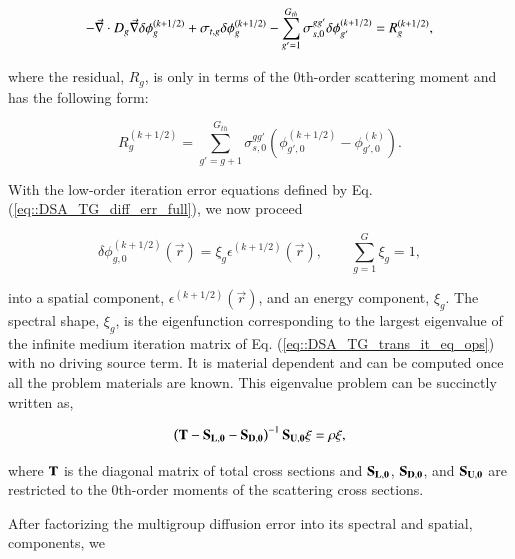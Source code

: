 \documentclass[preprint,10pt]{elsarticle}
\begin{document}
\begin{equation}
\label{eq::DSA_TG_diff_err_full}
-\vec{\nabla} \cdot D_g \vec{\nabla} \delta \phi_{g}^{(k+1/2)} + \sigma_{t,g} \delta \phi_{g}^{(k+1/2)} - \sum\displaylimits_{g'=1}^{G_{th}} \sigma_{s,0}^{g g'} \delta \phi_{g'}^{(k+1/2)} = R_g^{(k+1/2)} ,
\end{equation}

\noindent where the residual, $R_g$, is only in terms of the 0th-order scattering moment and has the following form:

\begin{equation}
\label{eq::DSA_TG_diff_residual}
R_g^{(k+1/2)} = \sum_{g'=g+1}^{G_{th}} \sigma_{s,0}^{g g'} \left( \phi_{g',0}^{(k+1/2)} - \phi_{g',0}^{(k)} \right) .
\end{equation}


With the low-order iteration error equations defined by Eq. (\ref{eq::DSA_TG_diff_err_full}), we now proceed

\begin{equation}
\label{eq::DSA_TG_fact_err}
\delta \phi_{g,0}^{(k+1/2)} (\vec{r}) = \xi_g \epsilon^{(k+1/2)} (\vec{r}), \qquad \sum_{g=1}^G \xi_g = 1,
\end{equation}

\noindent into a spatial component, $\epsilon^{(k+1/2)} (\vec{r})$, and an energy component, $\xi_g$. The spectral shape, $\xi_g$, is the eigenfunction corresponding to the largest eigenvalue of the infinite medium iteration matrix of Eq. (\ref{eq::DSA_TG_trans_it_eq_ops}) with no driving source term. It is material dependent and can be computed once all the problem materials are known. This eigenvalue problem can be succinctly written as,

\begin{equation}
\label{eq::DSA_TG_eigenpprob}
\left(  {\bf T} - {\bf S_{L,0}} - {\bf S_{D,0}} \right)^{-1} {\bf S_{U,0}} \xi = \rho \xi ,
\end{equation}

\noindent where ${\bf T}$ is the diagonal matrix of total cross sections and ${\bf S_{L,0}}$, ${\bf S_{D,0}}$, and ${\bf S_{U,0}}$ are restricted to the 0th-order moments of the scattering cross sections.


After factorizing the multigroup diffusion error into its spectral and spatial, components, we 
\end{document}
